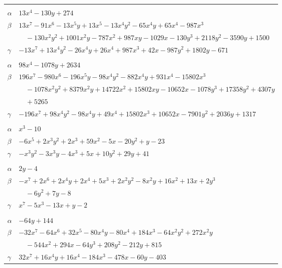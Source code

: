 \documentclass[11pt]{article}
\begin{document}
\begin{longtable}{@{}ll@{}}
\addlinespace[3pt]
\multicolumn{2}{@{}l}{$\{i,j\}=\{20,96\}$, $k_{ij}=2^{4}\cdot 3^{3}$}\\
$\alpha$ & $13x^{4}-130y+274$\\
$\beta$ & $13x^{7}-91x^{6}-13x^{5}y+13x^{5}-13x^{4}y^{2}-65x^{4}y+65x^{4}-987x^{3}$\\
 & $\quad -130x^{2}y^{2}+1001x^{2}y-787x^{2}+987xy-1029x-130y^{3}+2118y^{2}-3590y+1500$\\
$\gamma$ & $-13x^{7}+13x^{4}y^{2}-26x^{4}y+26x^{4}+987x^{3}+42x-987y^{2}+1802y-671$\\
\addlinespace[3pt]
\multicolumn{2}{@{}l}{$\{i,j\}=\{20,98\}$, $k_{ij}=2^{10}\cdot 3^{2}$}\\
$\alpha$ & $98x^{4}-1078y+2634$\\
$\beta$ & $196x^{7}-980x^{6}-196x^{5}y-98x^{4}y^{2}-882x^{4}y+931x^{4}-15802x^{3}$\\
 & $\quad -1078x^{2}y^{2}+8379x^{2}y+14722x^{2}+15802xy-10652x-1078y^{3}+17358y^{2}+4307y$\\
 & $\quad +5265$\\
$\gamma$ & $-196x^{7}+98x^{4}y^{2}-98x^{4}y+49x^{4}+15802x^{3}+10652x-7901y^{2}+2036y+1317$\\
\addlinespace[3pt]
\multicolumn{2}{@{}l}{$\{i,j\}=\{21,27\}$, $k_{ij}=2\cdot 3^{3}$}\\
$\alpha$ & $x^{3}-10$\\
$\beta$ & $-6x^{5}+2x^{3}y^{2}+2x^{3}+59x^{2}-5x-20y^{2}+y-23$\\
$\gamma$ & $-x^{3}y^{2}-3x^{3}y-4x^{3}+5x+10y^{2}+29y+41$\\
\addlinespace[3pt]
\multicolumn{2}{@{}l}{$\{i,j\}=\{21,48\}$, $k_{ij}=2\cdot 3$}\\
$\alpha$ & $2y-4$\\
$\beta$ & $-x^{7}+2x^{6}+2x^{4}y+2x^{4}+5x^{3}+2x^{2}y^{2}-8x^{2}y+16x^{2}+13x+2y^{3}$\\
 & $\quad -6y^{2}+7y-8$\\
$\gamma$ & $x^{7}-5x^{3}-13x+y-2$\\
\addlinespace[3pt]
\multicolumn{2}{@{}l}{$\{i,j\}=\{21,64\}$, $k_{ij}=3^{3}\cdot 5$}\\
$\alpha$ & $-64y+144$\\
$\beta$ & $-32x^{7}-64x^{6}+32x^{5}-80x^{4}y-80x^{4}+184x^{3}-64x^{2}y^{2}+272x^{2}y$\\
 & $\quad -544x^{2}+294x-64y^{3}+208y^{2}-212y+815$\\
$\gamma$ & $32x^{7}+16x^{4}y+16x^{4}-184x^{3}-478x-60y-403$\\

\end{longtable}
\end{document}

